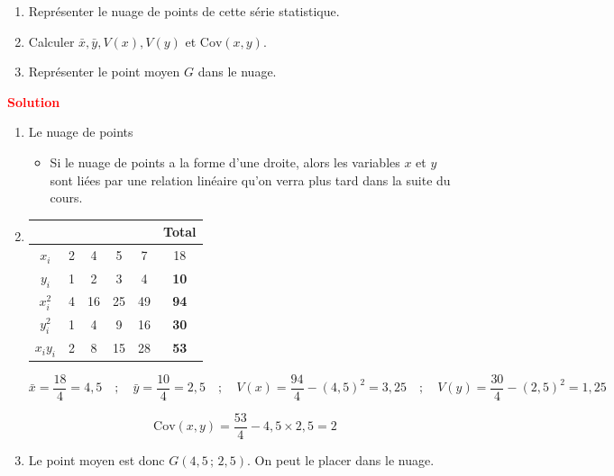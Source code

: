 \documentclass[12pt,a4paper]{article}
\begin{document}
\vspace{0.5cm}

\begin{enumerate}
    \item Représenter le nuage de points de cette série statistique.
    \item Calculer \( \bar{x}, \bar{y}, V(x), V(y) \) et \( \text{Cov}(x, y) \).
    \item Représenter le point moyen \( G \) dans le nuage.
\end{enumerate}
\noindent \textbf{\textcolor{red}{Solution}}

\begin{enumerate}
    \item Le nuage de points
\begin{center}
\end{center}

\begin{itemize}
    \item Si le nuage de points a la forme d’une droite, alors les variables \( x \) et \( y \) sont liées par une relation linéaire qu’on verra plus tard dans la suite du cours.
\end{itemize}
    \item 
    \begin{tabular}{|c|c|c|c|c|c|}
    \hline
      &  &  &  &  & \textbf{Total} \\
    \hline
    \( x_i \) & 2 & 4 & 5 & 7 & 18 \\
    \hline
    \( y_i \) & 1 & 2 & 3 & 4 & \textbf{10} \\
    \hline
    \( x_i^2 \) & 4 & 16 & 25 & 49 & \textbf{94} \\
    \hline
    \( y_i^2 \) & 1 & 4 & 9 & 16 & \textbf{30} \\
    \hline
    \( x_i y_i \) & 2 & 8 & 15 & 28 & \textbf{53} \\
    \hline
    \end{tabular}
    

    \[
    \bar{x} = \frac{18}{4} = 4{,}5 \quad ; \quad
    \bar{y} = \frac{10}{4} = 2{,}5
    \quad ; \quad
    V(x) = \frac{94}{4} - (4{,}5)^2 = 3{,}25
    \quad ; \quad
    V(y) = \frac{30}{4} - (2{,}5)^2 = 1{,}25
    \]

    \[
    \text{Cov}(x, y) = \frac{53}{4} - 4{,}5 \times 2{,}5 = 2
    \]

    \item Le point moyen est donc \( G(4{,}5 \, ; \, 2{,}5) \). On peut le placer dans le nuage.
\end{enumerate}
\end{document}
